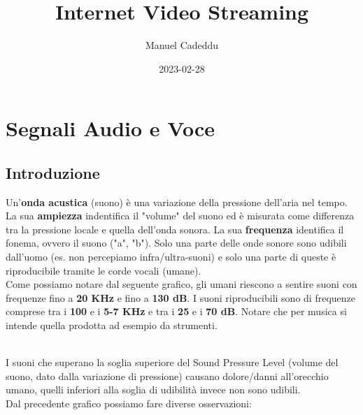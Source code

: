 \documentclass{article}
\title{Internet Video Streaming}
\date{2023-02-28}
\author{Manuel Cadeddu}
\begin{document}
	\maketitle
	\newpage
	\doublespacing
	\tableofcontents
	\singlespacing
	\newpage

	\section{Segnali Audio e Voce}

		\subsection{Introduzione}
			Un'\textbf{onda acustica} (suono) è una variazione della pressione dell'aria nel tempo. La sua \textbf{ampiezza} indentifica il "volume" del suono ed è misurata come differenza tra la pressione locale e quella dell'onda sonora. La sua \textbf{frequenza} identifica il fonema, ovvero il suono ("a", "b"). Solo una parte delle onde sonore sono udibili dall'uomo (es. non percepiamo infra/ultra-suoni) e solo una parte di queste è riproducibile tramite le corde vocali (umane).
			\\Come possiamo notare dal seguente grafico, gli umani riescono a sentire suoni con frequenze fino a \textbf{20 KHz} e fino a \textbf{130 dB}. I suoni riproducibili sono di frequenze comprese tra i \textbf{100} e i \textbf{5-7 KHz} e tra i \textbf{25} e i \textbf{70 dB}. Notare che per musica si intende quella prodotta ad esempio da strumenti.
			\begin{figure}[ht!]
			\end{figure}
			\\I suoni che superano la soglia superiore del Sound Pressure Level (volume del suono, dato dalla variazione di pressione) causano dolore/danni all'orecchio umano, quelli inferiori alla soglia di udibilità invece non sono udibili.
			\\Dal precedente grafico possiamo fare diverse osservazioni:
\end{document}
